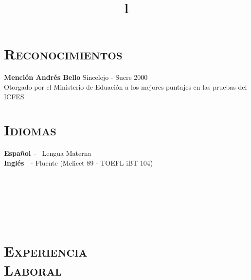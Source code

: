 \begin{resume}

\section{\textsc{Reconocimientos}}
\textbf{Menci\'{o}n Andr\'{e}s Bello} \hfill  Sincelejo - Sucre 2000  \\
Otorgado por el Ministerio de Eduaci\'{o}n a los mejores puntajes en
las pruebas del ICFES \hfill 

\section{\textsc{Idiomas}}
\textbf{Espa\~{n}ol}\   - \  Lengua Materna \\
\textbf{Ingl\'{e}s}\ \  -  Fluente (Melicet 89 - TOEFL iBT 104)

\begin{formatb}
  \title{l}\\
 \\
  \body\\
\end{formatb}

\section{\textsc{\\Experiencia \\ Laboral}}



\end{resume}
